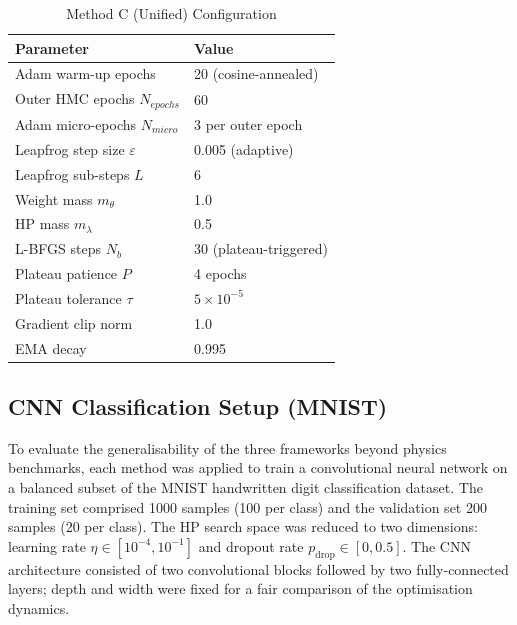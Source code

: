 \documentclass[11pt]{article}
\begin{document}
\begin{table}[H]
\centering
\caption{Method C (Unified) Configuration}
\label{tab:setup_c}
\renewcommand{\arraystretch}{1.2}
\begin{tabular}{ll}
\toprule
Parameter & Value \\
\midrule
Adam warm-up epochs              & 20 (cosine-annealed) \\
Outer HMC epochs $N_{epochs}$   & 60 \\
Adam micro-epochs $N_{micro}$   & 3 per outer epoch \\
Leapfrog step size $\varepsilon$ & 0.005 (adaptive) \\
Leapfrog sub-steps $L$          & 6 \\
Weight mass $m_\theta$           & 1.0 \\
HP mass $m_\lambda$              & 0.5 \\
L-BFGS steps $N_b$               & 30 (plateau-triggered) \\
Plateau patience $P$             & 4 epochs \\
Plateau tolerance $\tau$         & $5 \times 10^{-5}$ \\
Gradient clip norm               & 1.0 \\
EMA decay                        & 0.995 \\
\bottomrule
\end{tabular}
\end{table}

\subsection{CNN Classification Setup (MNIST)}

To evaluate the generalisability of the three frameworks beyond
physics benchmarks, each method was applied to train a convolutional
neural network on a balanced subset of the MNIST handwritten digit
classification dataset.  The training set comprised 1000 samples (100
per class) and the validation set 200 samples (20 per class).  The HP
search space was reduced to two dimensions: learning rate
$\eta \in [10^{-4}, 10^{-1}]$ and dropout rate $p_{\mathrm{drop}} \in [0, 0.5]$.
The CNN architecture consisted of two convolutional blocks followed by
two fully-connected layers; depth and width were fixed for a fair
comparison of the optimisation dynamics.
\end{document}
